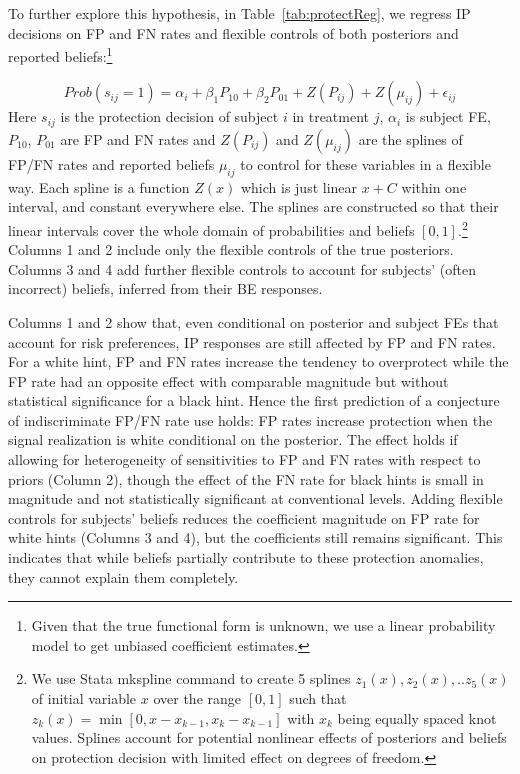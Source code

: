 \documentclass[12pt,a4paper]{article}
\begin{document}






To further explore this hypothesis, in Table~\ref{tab:protectReg}, we regress IP decisions on FP and FN rates and flexible controls of both posteriors and reported beliefs:\footnote{Given that the true functional form is unknown, we use a linear probability model to get unbiased coefficient estimates.}

	\[Prob(s_{ij}=1)=\alpha_i+\beta_1 P_{10}+\beta_2 P_{01} +Z(P_{ij})+Z(\mu_{ij})+\epsilon_{ij} \]
Here $s_{ij}$ is the protection decision of subject $i$ in treatment $j$, $\alpha_i$ is subject FE, $P_{10}$, $P_{01}$ are FP and FN rates and $Z(P_{ij})$ and $Z(\mu_{ij})$ are the splines of FP/FN rates  and reported beliefs $\mu_{ij}$ to control for these variables in a flexible way. Each spline is a function $Z(x)$ which is just linear $x+C$ within one interval, and constant everywhere else. The splines are constructed so that their linear intervals cover the whole domain of probabilities and beliefs $[0,1]$.\footnote{We use Stata mkspline command to create 5 splines $z_1(x),z_2(x),..z_5(x)$ of initial variable $x$ over the range $[0,1]$ such that $z_k(x)=\min[0,x-x_{k-1},x_k-x_{k-1}]$ with $x_k$ being equally spaced knot values. Splines account for potential nonlinear effects of posteriors and beliefs on protection decision with limited effect on degrees of freedom.} Columns 1 and 2 include only the flexible controls of the true posteriors. Columns 3 and 4 add further flexible controls to account for subjects' (often incorrect) beliefs, inferred from their BE responses.

Columns 1 and 2 show that, even conditional on posterior and subject FEs that account for risk preferences, IP responses are still affected by FP and FN rates. For a white hint, FP and FN rates increase the tendency to overprotect while the FP rate had an opposite effect with comparable magnitude but without statistical significance for a black hint. Hence the first prediction of a conjecture of indiscriminate FP/FN rate use holds: FP rates increase protection when the signal realization is white conditional on the posterior. The effect holds if allowing for heterogeneity of sensitivities to FP and FN rates with respect to priors (Column 2), though the effect of the FN rate for black hints is small in magnitude and not statistically significant at conventional levels. Adding flexible controls for subjects' beliefs reduces the coefficient magnitude on FP rate for white hints (Columns 3 and 4), but the coefficients still remains significant. This indicates that while beliefs partially contribute to these protection anomalies, they cannot explain them completely.
\end{document}
